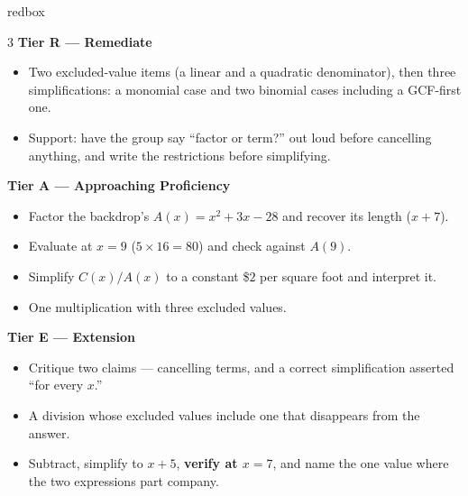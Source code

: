 \documentclass[10pt]{article}
\begin{document}
\boxguard
\begin{skillbox}{redbox}
\begin{multicols}{3}
\textbf{Tier R --- Remediate}
\begin{itemize}[leftmargin=1em, itemsep=1pt, topsep=2pt]
  \item Two excluded-value items (a linear and a quadratic denominator), then three
        simplifications: a monomial case and two binomial cases including a GCF-first one.
  \item Support: have the group say ``factor or term?'' out loud before cancelling anything, and
        write the restrictions before simplifying.
\end{itemize}

\columnbreak
\textbf{Tier A --- Approaching Proficiency}
\begin{itemize}[leftmargin=1em, itemsep=1pt, topsep=2pt]
  \item Factor the backdrop's $A(x)=x^2+3x-28$ and recover its length ($x+7$).
  \item Evaluate at $x=9$ ($5 \times 16 = 80$) and check against $A(9)$.
  \item Simplify $C(x)/A(x)$ to a constant \$$2$ per square foot and interpret it.
  \item One multiplication with three excluded values.
\end{itemize}

\columnbreak
\textbf{Tier E --- Extension}
\begin{itemize}[leftmargin=1em, itemsep=1pt, topsep=2pt]
  \item Critique two claims --- cancelling terms, and a correct simplification asserted ``for
        every $x$.''
  \item A division whose excluded values include one that disappears from the answer.
  \item Subtract, simplify to $x+5$, \textbf{verify at $x=7$}, and name the one value where the
        two expressions part company.
\end{itemize}
\end{multicols}
\end{skillbox}
\end{document}
